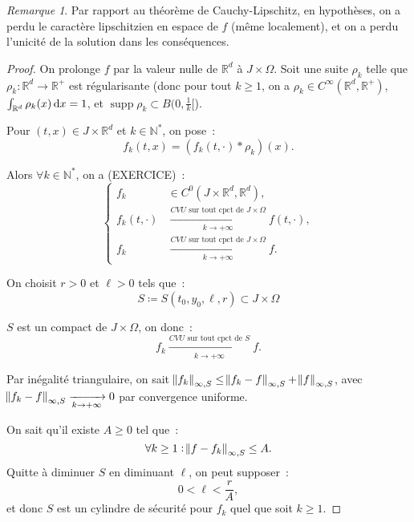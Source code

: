 \documentclass{report}
\theoremstyle{definition}
\theoremstyle{remark}
\newtheorem*{rmq}{Remarque}
\numberwithin{equation}{section}
\newcommand{\R}{\mathbb R}
\newcommand{\N}{\mathbb N}
\newcommand{\Ns}{\N^{*}}
\DeclareMathOperator{\supp}{supp}
\newcommand{\CONV}[5]{\xrightarrow[#2 \to #3]{#4 \text{ #5 } #1}}
\newcommand{\CVUc}[3]{\CONV{#1}{#2}{#3}{CVU}{sur tout cpct de}}
\newcommand{\pinfty}{{+\infty}}
\begin{document}
		\begin{rmq}Par rapport au théorème de Cauchy-Lipschitz, en hypothèses, on a perdu le caractère lipschitzien en espace de $f$ (même localement), et on
		a perdu l'unicité de la solution dans les conséquences.
		\end{rmq}

		\begin{proof} On prolonge $f$ par la valeur nulle de $\R^d$ à $J \times \Omega$. Soit une suite $\rho_k$ telle que $\rho_k : \R^d \to \R^+$ est
		régularisante (donc pour tout $k \geq 1$, on a $\rho_k \in C^\infty(\R^d, \R^+)$, $\int_{\R^d}\rho_k(x)\dif x = 1$, et $\supp \rho_k \subset B(0, \frac 1k[$).

		Pour $(t, x) \in J \times \R^d$ et $k \in \Ns$, on pose~:
		\begin{equation}
			f_k(t, x) = \left(f_k(t, \cdot) * \rho_k\right)(x).
		\end{equation}

		Alors $\forall k \in \Ns$, on a (EXERCICE)~:
		\begin{equation}
			\begin{cases}
			f_k &\in C^0(J \times \R^d, \R^d), \\
			f_k(t, \cdot) &\CVUc {J \times \Omega}k\pinfty f(t, \cdot), \\
			f_k &\CVUc {J \times \Omega}k\pinfty f.
		\end{cases}
		\end{equation}

		On choisit $r > 0$ et $\ell > 0$ tels que~:
		\begin{equation}
			S \coloneqq S(t_0, y_0, \ell, r) \subset J \times \Omega
		\end{equation}

		$S$ est un compact de $J \times \Omega$, on donc~:
		\begin{equation}
			f_k \CVUc Sk\pinfty f.
		\end{equation}

		Par inégalité triangulaire, on sait $\norm {f_k}_{\infty, S} \leq \norm {f_k - f}_{\infty, S} + \norm f_{\infty, S}$, avec
		$\norm {f_k - f}_{\infty, S} \xrightarrow[k \to \pinfty]{} 0$ par convergence uniforme.

		On sait qu'il existe $A \geq 0$ tel que~:
		\begin{equation}
			\forall k \geq 1 : \norm {f-f_k}_{\infty, S} \leq A.
		\end{equation}
		Quitte à diminuer $S$ en diminuant $\ell$, on peut supposer~:
		\begin{equation}
			0 < \ell < \frac rA,
		\end{equation}
		et donc $S$ est un cylindre de sécurité pour $f_k$ quel que soit $k \geq 1$.


\end{proof}
\end{document}

